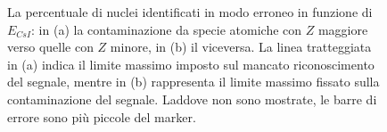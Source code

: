\begin{figure}[!p] 
	\centering
	\hspace{10mm}
	\caption{La percentuale di nuclei identificati in modo erroneo in funzione di $E_{CsI}$: in (a) la contaminazione da specie atomiche con $Z$ maggiore verso quelle con $Z$ minore, in (b) il viceversa. La linea tratteggiata in (a) indica il limite massimo imposto sul mancato riconoscimento del segnale, mentre in (b) rappresenta il limite massimo fissato sulla contaminazione del segnale. Laddove non sono mostrate, le barre di errore sono più piccole del marker.} \label{fig:leakage_res}
\end{figure}
